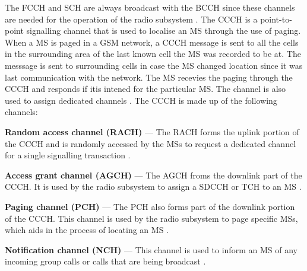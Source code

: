 The FCCH and SCH are always broadcast with the BCCH since these channels are needed for the operation of the radio subsystem \cite{GSMArchitectureProtocolsServices}. The CCCH is a point-to-point signalling channel that is used to localise an MS through the use of paging\cite{GSMArchitectureProtocolsServices}. When a MS is paged in a GSM network, a CCCH message is sent to all the cells in the surrounding area of the last known cell the MS was recorded to be at\cite{GSMArchitectureProtocolsServices}. The messsage is sent to surrounding cells in case the MS changed location since it was last communication with the network\cite{GSMArchitectureProtocolsServices}. The MS recevies the paging through the CCCH and responds if itis intened for the particular MS\cite{GSMArchitectureProtocolsServices}. The channel is also used to assign dedicated channels \cite{GSMArchitectureProtocolsServices}. The CCCH is made up of the following channels:
\begin{description}
\item{\textbf{Random access channel (RACH)}} --- The RACH forms the uplink portion of the CCCH and is randomly accessed by the MSs to request a dedicated channel for a single signalling transaction \cite{GSMArchitectureProtocolsServices}.
\item{\textbf{Access grant channel (AGCH)}} --- The AGCH froms the downlink part of the CCCH\@. It is used by the radio subsystem to assign a SDCCH or TCH to an MS \cite{GSMArchitectureProtocolsServices}.
\item{\textbf{Paging channel (PCH)}} --- The PCH also forms part of the downlink portion of the CCCH\@. This channel is used by the radio subsystem to page specific MSs, which aids in the process of locating an MS \cite{GSMArchitectureProtocolsServices}.
\item{\textbf{Notification channel (NCH)}} --- This channel is used to inform an MS of any incoming group calls or calls that are being broadcast \cite{GSMArchitectureProtocolsServices}.
\end{description}

